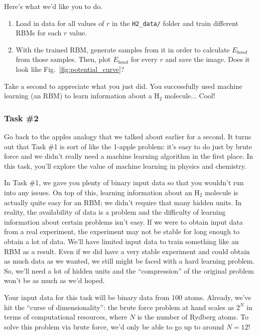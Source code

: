 \documentclass[12pt]{article}
\begin{document}
Here's what we'd like you to do.
\begin{enumerate}
    \item Load in data for all values of $r$ in the \texttt{H2\_data/} folder and train different RBMs for each $r$ value.
    \item With the trained RBM, generate samples from it in order to calculate $E_{bond}$ from those samples. Then, plot $E_{bond}$ for every $r$ and save the image. Does it look like Fig.~\ref{fig:potential_curve}?
\end{enumerate}
Take a second to appreciate what you just did. You successfully used machine learning (an RBM) to learn information about a H$_2$ molecule... Cool! 

\subsubsection*{Task \#2}

Go back to the apples analogy that we talked about earlier for a second. It turns out that Task \#1 is sort of like the 1-apple problem: it's easy to do just by brute force and we didn't really need a machine learning algorithm in the first place.  In this task, you'll explore the value of machine learning in physics and chemistry. 

In Task \#1, we gave you plenty of binary input data so that you wouldn't run into any issues. On top of this, learning information about an H$_2$ molecule is actually quite easy for an RBM; we didn't require that many hidden units. In reality, the availability of data is a problem and the difficulty of learning information about certain problems isn't easy. If we were to obtain input data from a real experiment, the experiment may not be stable for long enough to obtain a lot of data. We'll have limited input data to train something like an RBM as a result. Even if we did have a very stable experiment and could obtain as much data as we wanted, we still might be faced with a hard learning problem. So, we'll need a lot of hidden units and the ``compression'' of the original problem won't be as much as we'd hoped.

Your input data for this task will be binary data from 100 atoms. Already, we've hit the ``curse of dimensionality'': the brute force problem at hand scales as $2^N$ in terms of computational resources, where $N$ is the number of Rydberg atoms. To solve this problem via brute force, we'd only be able to go up to around $N = 12$! 
\end{document}
